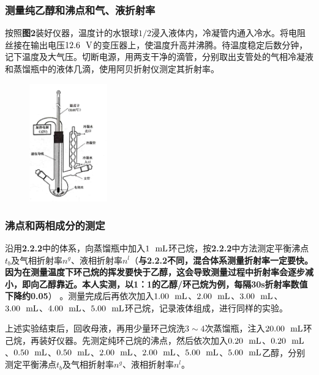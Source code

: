 \documentclass[12pt]{article}
\begin{document}
			\subsubsection{测量纯乙醇和沸点和气、液折射率}
				按照\textbf{图2}装好仪器，温度计的水银球$1/2$浸入液体内，冷凝管内通入冷水。将电阻丝接在输出电压$12.6\ \ {\rm V}$的变压器上，使温度升高并沸腾。待温度稳定后数分钟，记下温度及大气压。切断电源，用两支干净的滴管，分别取出支管处的气相冷凝液和蒸馏瓶中的液体几滴，使用阿贝折射仪测定其折射率。\par
				\begin{figure}[h]
					\centering
					\includegraphics[width=0.3\textwidth]{2.png}
				\end{figure}
			
			\subsubsection{沸点和两相成分的测定}
				沿用\textbf{2.2.2}中的体系，向蒸馏瓶中加入$1\ \ {\rm mL}$环己烷，按\textbf{2.2.2}中方法测定平衡沸点$t_{b}$及气相折射率$n^{g}$、液相折射率$n^{l}$（\textbf{与2.2.2不同，混合体系测量折射率一定要快。因为在测量温度下环己烷的挥发要快于乙醇，这会导致测量过程中折射率会逐步减小，即向乙醇靠近。本人实测，以1：1的乙醇/环己烷为例，每隔30s折射率数值下降约0.05}） 。测量完成后再依次加入$1.00\ \ {\rm mL}$、$2.00\ \ {\rm mL}$、$3.00\ \ {\rm mL}$、$3.00\ \ {\rm mL}$、$4.00\ \ {\rm mL}$、$5.00\ \ {\rm mL}$环己烷，记录液体组成，进行同样的实验。\par
				上述实验结束后，回收母液，再用少量环己烷洗$3\sim 4$次蒸馏瓶，注入$20.00\ \ {\rm mL}$环己烷，再装好仪器。先测定纯环己烷的沸点，然后依次加入$0.20\ \ {\rm mL}$、$0.20\ \ {\rm mL}$、$0.50\ \ {\rm mL}$、$0.50\ \ {\rm mL}$、$2.00\ \ {\rm mL}$、$2.00\ \ {\rm mL}$、$5.00\ \ {\rm mL}$、$5.00\ \ {\rm mL}$乙醇，分别测定平衡沸点$t_{b}$及气相折射率$n^{g}$、液相折射率$n^{l}$。
\end{document}
